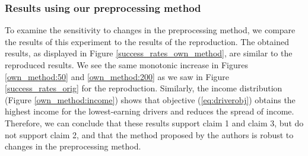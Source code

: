 \subsubsection{Results using our preprocessing method}
\label{section:resultspreprocessing}
To examine the sensitivity to changes in the preprocessing method, we compare the results of this experiment to the results of the reproduction. The obtained results, as displayed in Figure \ref{success_rates_own_method}, are similar to the reproduced results. We see the same monotonic increase in Figures \ref{own_method:50} and \ref{own_method:200} as we saw in Figure \ref{success_rates_orig} for the reproduction. Similarly, the income distribution (Figure \ref{own_method:income}) shows that objective (\ref{eq:driverobj}) obtains the highest income for the lowest-earning drivers and reduces the spread of income. Therefore, we can conclude that these results support claim 1 and claim 3, but do not support claim 2, and that the method proposed by the authors is robust to changes in the preprocessing method.

